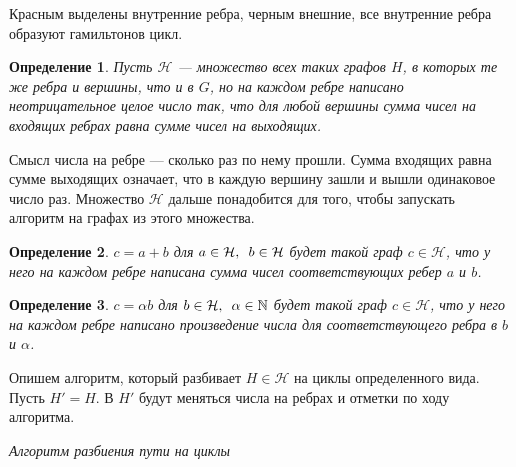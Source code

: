 \documentclass{article}
\newcommand{\squad}{
    \hspace{0.5em}
}
\newtheorem{definition}{Определение}
\begin{document}
Красным выделены внутренние ребра, черным внешние, все внутренние ребра образуют гамильтонов цикл.

\begin{definition}
    Пусть $\mathcal{H}$ --- множество всех таких графов $H$, в которых те же ребра и вершины, что и в $G$, но на каждом ребре написано неотрицательное целое число так, что для любой вершины сумма чисел на входящих ребрах равна сумме чисел на выходящих. 
\end{definition}

Смысл числа на ребре --- сколько раз по нему прошли. Сумма входящих равна сумме выходящих означает, что в каждую вершину зашли и вышли одинаковое число раз.
Множество $\mathcal{H}$ дальше понадобится для того, чтобы запускать алгоритм на графах из этого множества.

\begin{definition}
    $c = a + b$ для $a \in \mathcal{H}, \squad b \in \mathcal{H}$ будет такой граф $c \in \mathcal{H}$, что у него на каждом ребре написана сумма чисел соответствующих ребер $a$ и $b$.
\end{definition}

\begin{definition}
    $c = \alpha b$ для $b \in \mathcal{H}, \squad \alpha \in \mathbb{N}$ будет такой граф $c \in \mathcal{H}$, что у него на каждом ребре написано произведение числа для соответствующего ребра в $b$ и $\alpha$.
\end{definition}



Опишем алгоритм, который разбивает $H \in \mathcal{H}$ на циклы определенного вида.
Пусть $H' = H$. В $H'$ будут меняться числа на ребрах и отметки по ходу алгоритма.
\begin{center}
    \textit{Алгоритм разбиения пути на циклы}
\end{center}

\begin{center}
\end{center}
\end{document}
